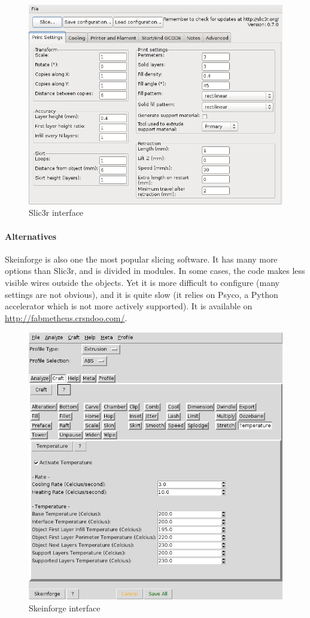 \documentclass{article}
\begin{document}
	\begin{figure}[h!]
		\centering
		\includegraphics[width=0.6\linewidth]{slic3r.png}
		\caption{Slic3r interface}
	\end{figure}

	\paragraph{Alternatives} Skeinforge is also one the most popular slicing software. It has many more options than Slic3r, and is divided in modules. In some cases, the code makes less visible wires outside the objects. Yet it is more difficult to configure (many settings are not obvious), and it is quite slow (it relies on Psyco, a Python accelerator which is not more actively supported). It is available on \url{http://fabmetheus.crsndoo.com/}.

	\begin{figure}[h!]
		\centering
		\includegraphics[width=0.6\linewidth]{skeinforge.png}
		\caption{Skeinforge interface}
	\end{figure}

\newpage
\end{document}
